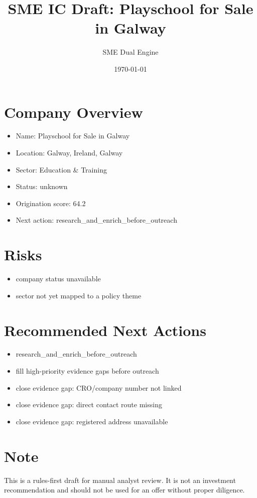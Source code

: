 \documentclass[11pt,a4paper]{article}
\title{SME IC Draft: Playschool for Sale in Galway}
\author{SME Dual Engine}
\date{\today}
\begin{document}
\maketitle
\section*{Company Overview}
\begin{itemize}[leftmargin=1.4em]
\item Name: Playschool for Sale in Galway
\item Location: Galway, Ireland, Galway
\item Sector: Education \& Training
\item Status: unknown
\item Origination score: 64.2
\item Next action: research\_and\_enrich\_before\_outreach
\end{itemize}
\section*{Risks}
\begin{itemize}[leftmargin=1.4em]
\item company status unavailable
\item sector not yet mapped to a policy theme
\end{itemize}
\section*{Recommended Next Actions}
\begin{itemize}[leftmargin=1.4em]
\item research\_and\_enrich\_before\_outreach
\item fill high-priority evidence gaps before outreach
\item close evidence gap: CRO/company number not linked
\item close evidence gap: direct contact route missing
\item close evidence gap: registered address unavailable
\end{itemize}
\section*{Note}
This is a rules-first draft for manual analyst review. It is not an investment
recommendation and should not be used for an offer without proper diligence.
\end{document}

